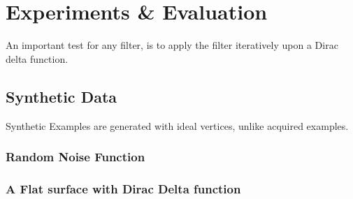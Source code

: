 \chapter{Experiments \& Evaluation}
An important test for any filter\todoCitation {}, is to apply the filter iteratively upon a Dirac delta function\todoCitation.
\section{Synthetic Data}
Synthetic Examples are generated with ideal vertices, unlike acquired examples.

\subsection{Random Noise Function}

\subsection{A Flat surface with Dirac Delta function}
